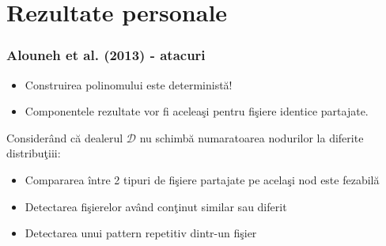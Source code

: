 \documentclass{beamer}
\theoremstyle{definition}
\begin{document}
\section{Rezultate personale}
\begin{frame}
    \frametitle{Alouneh et al. (2013) - atacuri}
     {
        \begin{itemize}
            \item Construirea polinomului este determinist\u{a}!
            \pause
            \item Componentele rezultate vor fi acelea\c{s}i pentru fi\c{s}iere identice partajate.
        \end{itemize}
    }
     {
        Consider\^{a}nd c\u{a} dealerul $\mathcal{D}$ nu schimb\u{a} numaratoarea nodurilor la diferite distribu\c{t}iii:
        \begin{itemize}
            \item Compararea \^{i}ntre 2 tipuri de fi\c{s}iere partajate pe acela\c{s}i nod este fezabil\u{a}
            \pause
            \item Detectarea fi\c{s}ierelor av\^{a}nd con\c{t}inut similar sau diferit
            \pause
            \item Detectarea unui pattern repetitiv dintr-un fi\c{s}ier
        \end{itemize}
    }
\end{frame}
\end{document}
